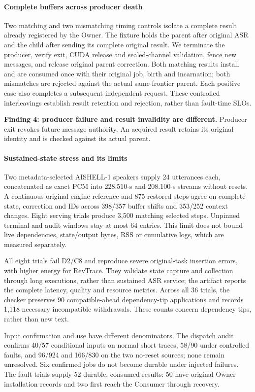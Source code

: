 \paragraph{Complete buffers across producer death}
Two matching and two mismatching timing controls isolate a complete result
already registered by the Owner. The fixture holds the parent after
original ASR and the child after sending its complete original result.
We terminate the producer, verify exit, CUDA release and sealed-channel
validation, fence new messages, and release original parent correction.
Both matching results install and are consumed once with their original
job, birth and incarnation; both mismatches are rejected against the
actual same-frontier parent. Each positive case also completes a subsequent
independent request. These controlled interleavings establish result
retention and rejection, rather than fault-time SLOs.
\par\noindent\textbf{Finding 4: producer failure and result invalidity are different.}
Producer exit revokes future message authority. An acquired result retains
its original identity and is checked against its actual parent.

\paragraph{Sustained-state stress and its limits}
Two metadata-selected AISHELL-1 speakers supply 24 utterances each,
concatenated as exact PCM into 228.510-s and 208.100-s streams without
resets. A continuous original-engine reference and 875 restored steps
agree on complete state, correction and IDs across 398/357 buffer shifts
and 353/252 context changes. Eight serving trials produce 3,500 matching
selected steps. Unpinned terminal and audit windows stay at most 64
entries. This limit does not bound live dependencies, state/output bytes,
RSS or cumulative logs, which are measured separately.

All eight trials fail D2/C8 and reproduce severe original-task insertion
errors, with higher energy for RevTrace. They validate state capture and
collection through long executions, rather than sustained ASR service;
the artifact reports the complete latency, quality and resource metrics.
Across all 36 trials, the checker preserves 90 compatible-ahead
dependency-tip applications and records 1,118 necessary incompatible
withdrawals. These counts concern dependency tips, rather than new text.

Input confirmation and use have different denominators. The dispatch
audit confirms 40/57 conditional inputs on normal short traces, 58/90
under controlled faults, and 96/924 and 166/830 on the two no-reset sources;
none remain unresolved. Six confirmed jobs do not become durable under
injected failures. The fault trials supply 52 durable, consumed results:
50 have original-Owner installation records and two first reach the
Consumer through recovery.
